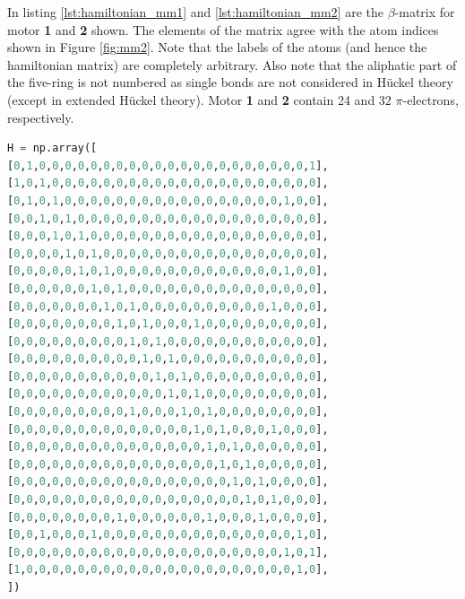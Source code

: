 \documentclass{article}
\begin{document}
In listing \ref{lst:hamiltonian_mm1} and \ref{lst:hamiltonian_mm2} are the $\beta$-matrix for motor \textbf{1} and \textbf{2} shown. The elements of the matrix agree with the atom indices shown in Figure \ref{fig:mm2}. Note that the labels of the atoms (and hence the hamiltonian matrix) are completely arbitrary. Also note that the aliphatic part of the five-ring is not numbered as single bonds are not considered in H\"uckel theory (except in extended H\"uckel theory). Motor \textbf{1} and \textbf{2} contain 24 and 32 $\pi$-electrons, respectively.

\begin{lstlisting}[language=Python,caption={Matrix of the resonance integrals of the Hamiltonian of motor 1},label={lst:hamiltonian_mm1}]
H = np.array([
[0,1,0,0,0,0,0,0,0,0,0,0,0,0,0,0,0,0,0,0,0,0,0,1],   
[1,0,1,0,0,0,0,0,0,0,0,0,0,0,0,0,0,0,0,0,0,0,0,0],
[0,1,0,1,0,0,0,0,0,0,0,0,0,0,0,0,0,0,0,0,0,1,0,0], 
[0,0,1,0,1,0,0,0,0,0,0,0,0,0,0,0,0,0,0,0,0,0,0,0], 
[0,0,0,1,0,1,0,0,0,0,0,0,0,0,0,0,0,0,0,0,0,0,0,0], 
[0,0,0,0,1,0,1,0,0,0,0,0,0,0,0,0,0,0,0,0,0,0,0,0], 
[0,0,0,0,0,1,0,1,0,0,0,0,0,0,0,0,0,0,0,0,0,1,0,0], 
[0,0,0,0,0,0,1,0,1,0,0,0,0,0,0,0,0,0,0,0,0,0,0,0], 
[0,0,0,0,0,0,0,1,0,1,0,0,0,0,0,0,0,0,0,0,1,0,0,0], 
[0,0,0,0,0,0,0,0,1,0,1,0,0,0,1,0,0,0,0,0,0,0,0,0], 
[0,0,0,0,0,0,0,0,0,1,0,1,0,0,0,0,0,0,0,0,0,0,0,0], 
[0,0,0,0,0,0,0,0,0,0,1,0,1,0,0,0,0,0,0,0,0,0,0,0], 
[0,0,0,0,0,0,0,0,0,0,0,1,0,1,0,0,0,0,0,0,0,0,0,0], 
[0,0,0,0,0,0,0,0,0,0,0,0,1,0,1,0,0,0,0,0,0,0,0,0], 
[0,0,0,0,0,0,0,0,0,1,0,0,0,1,0,1,0,0,0,0,0,0,0,0], 
[0,0,0,0,0,0,0,0,0,0,0,0,0,0,1,0,1,0,0,0,1,0,0,0], 
[0,0,0,0,0,0,0,0,0,0,0,0,0,0,0,1,0,1,0,0,0,0,0,0], 
[0,0,0,0,0,0,0,0,0,0,0,0,0,0,0,0,1,0,1,0,0,0,0,0], 
[0,0,0,0,0,0,0,0,0,0,0,0,0,0,0,0,0,1,0,1,0,0,0,0], 
[0,0,0,0,0,0,0,0,0,0,0,0,0,0,0,0,0,0,1,0,1,0,0,0], 
[0,0,0,0,0,0,0,0,1,0,0,0,0,0,0,1,0,0,0,1,0,0,0,0], 
[0,0,1,0,0,0,1,0,0,0,0,0,0,0,0,0,0,0,0,0,0,0,1,0], 
[0,0,0,0,0,0,0,0,0,0,0,0,0,0,0,0,0,0,0,0,0,1,0,1],
[1,0,0,0,0,0,0,0,0,0,0,0,0,0,0,0,0,0,0,0,0,0,1,0], 
])
\end{lstlisting}
\end{document}
